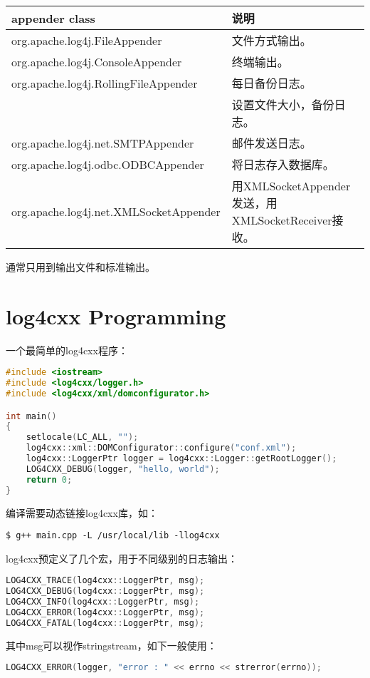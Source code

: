 \begin{tabular}{|l|l|}
\hline
appender class                          & 说明 \\\hline
org.apache.log4j.FileAppender           & 文件方式输出。    \\\hline
org.apache.log4j.ConsoleAppender        & 终端输出。        \\\hline
org.apache.log4j.RollingFileAppender    & 每日备份日志。    \\
                                        & 设置文件大小，备份日志。  \\\hline
org.apache.log4j.net.SMTPAppender       & 邮件发送日志。    \\\hline
org.apache.log4j.odbc.ODBCAppender      & 将日志存入数据库。    \\\hline
org.apache.log4j.net.XMLSocketAppender  & 用XMLSocketAppender发送，用XMLSocketReceiver接收。 \\\hline
\end{tabular}

通常只用到输出文件和标准输出。

\section{log4cxx Programming}
一个最简单的log4cxx程序：
\begin{lstlisting}[language=C++]
#include <iostream>
#include <log4cxx/logger.h>
#include <log4cxx/xml/domconfigurator.h>

int main()
{
    setlocale(LC_ALL, "");
    log4cxx::xml::DOMConfigurator::configure("conf.xml");
    log4cxx::LoggerPtr logger = log4cxx::Logger::getRootLogger();
    LOG4CXX_DEBUG(logger, "hello, world");
    return 0;
}
\end{lstlisting}

编译需要动态链接log4cxx库，如：
\begin{lstlisting}
$ g++ main.cpp -L /usr/local/lib -llog4cxx
\end{lstlisting}

log4cxx预定义了几个宏，用于不同级别的日志输出：

\begin{lstlisting}[language=C++]
LOG4CXX_TRACE(log4cxx::LoggerPtr, msg);
LOG4CXX_DEBUG(log4cxx::LoggerPtr, msg);
LOG4CXX_INFO(log4cxx::LoggerPtr, msg);
LOG4CXX_ERROR(log4cxx::LoggerPtr, msg);
LOG4CXX_FATAL(log4cxx::LoggerPtr, msg);
\end{lstlisting}

其中msg可以视作stringstream，如下一般使用：
\begin{lstlisting}[language=C++]
LOG4CXX_ERROR(logger, "error : " << errno << strerror(errno));
\end{lstlisting}

